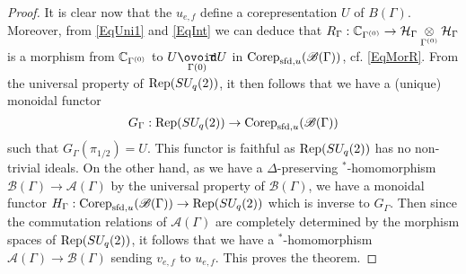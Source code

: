 \begin{proof}
It is clear now that the $u_{e,f}$ define a corepresentation $U$ of $B(\Gamma)$. Moreover, from \eqref{EqUni1} and \eqref{EqInt} we can deduce that $R_{\Gamma}: \mathbb{C}_{\Gamma^{(0)}}\rightarrow \mathcal{H}_{\Gamma}\underset{\Gamma^{(0)}}{\otimes}\mathcal{H}_{\Gamma}$ is a morphism from $\mathbb{C}_{\Gamma^{(0)}}$ to $U\Circtv{\Gamma{(0)}} U$ in $\mathrm{Corep}_{\mathrm{sfd},u}(\mathscr{B}(\Gamma))$, cf. \eqref{EqMorR}. From the universal property of $\mathrm{Rep}(SU_q(2))$, it then follows that we have a (unique) monoidal functor \[G_{\Gamma}: \mathrm{Rep}(SU_q(2)) \rightarrow \mathrm{Corep}_{\mathrm{sfd},u}(\mathscr{B}(\Gamma))\] such that $G_{\Gamma}(\pi_{1/2}) = U$. This functor is faithful as $\mathrm{Rep}(SU_q(2))$ has no non-trivial ideals. On the other hand, as we have a $\Delta$-preserving $^*$-homomorphism $\mathscr{B}(\Gamma)\rightarrow \mathscr{A}(\Gamma)$ by the universal property of $\mathscr{B}(\Gamma)$, we have a monoidal functor $H_{\Gamma}:  \mathrm{Corep}_{\mathrm{sfd},u}(\mathscr{B}(\Gamma))\rightarrow \mathrm{Rep}(SU_q(2))$ which is inverse to $G_{\Gamma}$. Then since the commutation relations of $\mathscr{A}(\Gamma)$ are completely determined by the morphism spaces of $\mathrm{Rep}(SU_q(2))$, it follows that we have a $^*$-homomorphism $\mathscr{A}(\Gamma)\rightarrow \mathscr{B}(\Gamma)$ sending $v_{e,f}$ to $u_{e,f}$. This proves the theorem. %
\end{proof}



